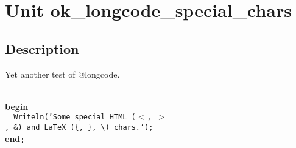 \documentclass{report}
\begin{document}
\label{toc}\tableofcontents
\newpage
\newlength{\tmplength}
\chapter{Unit ok{\_}longcode{\_}special{\_}chars}
\label{ok_longcode_special_chars}
\section{Description}
Yet another test of @longcode.\hfill\vspace*{1ex}



\texttt{\\\nopagebreak[3]
}\textbf{begin}\texttt{\\\nopagebreak[3]
~~Writeln('Some~special~HTML~({$<$},~{$>$},~{\&})~and~LaTeX~({\{},~{\}},~{\textbackslash})~chars.');\\\nopagebreak[3]
}\textbf{end}\texttt{;\\
}
\end{document}
